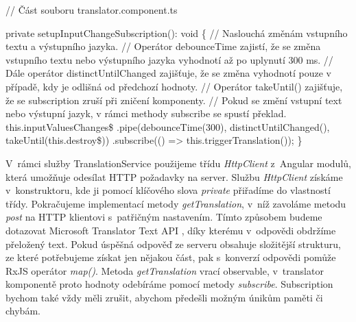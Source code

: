 \begin{prog}
// Část souboru translator.component.ts

private setupInputChangeSubscription(): void \{
  // Naslouchá změnám vstupního textu a výstupního jazyka.
  // Operátor debounceTime zajistí, že se změna vstupního textu 
    nebo výstupního jazyka vyhodnotí až po uplynutí 300 ms.
  // Dále operátor distinctUntilChanged zajišťuje, 
    že se změna vyhodnotí pouze v případě, kdy je odlišná od předchozí hodnoty.
  // Operátor takeUntil() zajišťuje, 
    že se subscription zruší při zničení komponenty.
  // Pokud se změní vstupní text nebo výstupní jazyk, 
    v rámci methody subscribe se spustí překlad.
  this.inputValuesChanges\$
    .pipe(debounceTime(300), distinctUntilChanged(), takeUntil(this.destroy\$))
    .subscribe(() => this.triggerTranslation());
\}
\end{prog}

V~rámci služby TranslationService použijeme třídu \emph{HttpClient} z~Angular modulů, která umožňuje odesílat HTTP požadavky na server.
Službu \emph{HttpClient} získáme v~konstruktoru, kde ji pomocí klíčového slova \emph{private} přiřadíme do vlastností třídy. 
Pokračujeme implementací metody \emph{getTranslation}, v~níž zavoláme metodu \emph{post} na HTTP klientovi s~patřičným nastavením. 
Tímto způsobem budeme dotazovat Microsoft Translator Text API \cite{translatortextapi}, díky kterému v~odpovědi obdržíme přeložený text. 
Pokud úspěšná odpověď ze serveru obsahuje složitější strukturu, ze které potřebujeme získat jen nějakou část, pak s~konverzí odpovědi pomůže RxJS operátor \emph{map()}. 
Metoda \emph{getTranslation} vrací observable, v~translator komponentě proto hodnoty odebíráme pomocí metody \emph{subscribe}. 
Subscription bychom také vždy měli zrušit, abychom předešli možným únikům paměti či chybám.

